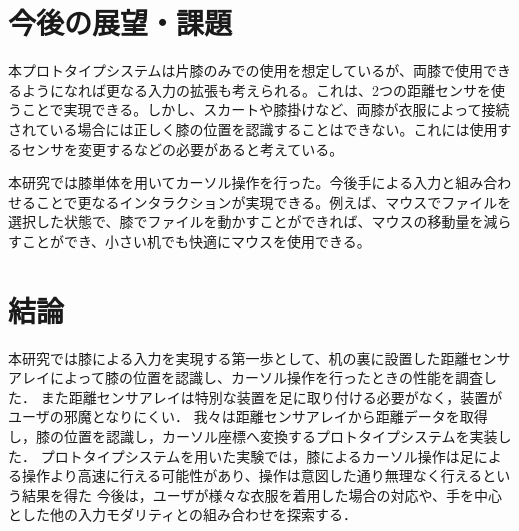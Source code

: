 \documentclass[submit, techrep]{ipsj}
\begin{document}
\section{今後の展望・課題}
本プロトタイプシステムは片膝のみでの使用を想定しているが、両膝で使用できるようになれば更なる入力の拡張も考えられる。これは、2つの距離センサを使うことで実現できる。しかし、スカートや膝掛けなど、両膝が衣服によって接続されている場合には正しく膝の位置を認識することはできない。これには使用するセンサを変更するなどの必要があると考えている。\par
本研究では膝単体を用いてカーソル操作を行った。今後手による入力と組み合わせることで更なるインタラクションが実現できる。例えば、マウスでファイルを選択した状態で、膝でファイルを動かすことができれば、マウスの移動量を減らすことができ、小さい机でも快適にマウスを使用できる。\par

\section{結論}
本研究では膝による入力を実現する第一歩として、机の裏に設置した距離センサアレイによって膝の位置を認識し、カーソル操作を行ったときの性能を調査した．
また距離センサアレイは特別な装置を足に取り付ける必要がなく，装置がユーザの邪魔となりにくい．
我々は距離センサアレイから距離データを取得し，膝の位置を認識し，カーソル座標へ変換するプロトタイプシステムを実装した．
プロトタイプシステムを用いた実験では，膝によるカーソル操作は足による操作より高速に行える可能性があり、操作は意図した通り無理なく行えるという結果を得た
今後は，ユーザが様々な衣服を着用した場合の対応や、手を中心とした他の入力モダリティとの組み合わせを探索する．



%
%
%




\begin{biography}
%
%
\end{biography}
\end{document}
